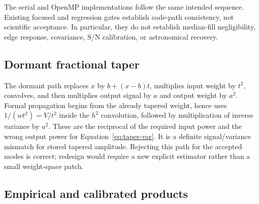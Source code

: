 \documentclass[11pt]{article}
\begin{document}
The serial and OpenMP implementations follow the same intended sequence.
Existing focused and regression gates establish code-path consistency, not
scientific acceptance.  In particular, they do not establish median-fill
negligibility, edge response, covariance, S/N calibration, or astronomical
recovery.

\subsection{Dormant fractional taper}

The dormant path replaces $x$ by $b+(x-b)t$, multiplies input weight by
$t^2$, convolves, and then multiplies output signal by $a$ and output weight
by $a^2$.  Formal propagation begins from the already tapered weight, hence
uses $1/(w t^2)=V/t^2$ inside the $h^2$ convolution, followed by multiplication
of inverse variance by $a^2$.  These are the reciprocal of the required input
power and the wrong output power for Equation~\eqref{eq:taper-var}.  It is a
definite signal/variance mismatch for stored tapered amplitude.  Rejecting
this path for the accepted modes is correct; redesign would require a new
explicit estimator rather than a small weight-space patch.

\subsection{Empirical and calibrated products}
\end{document}
